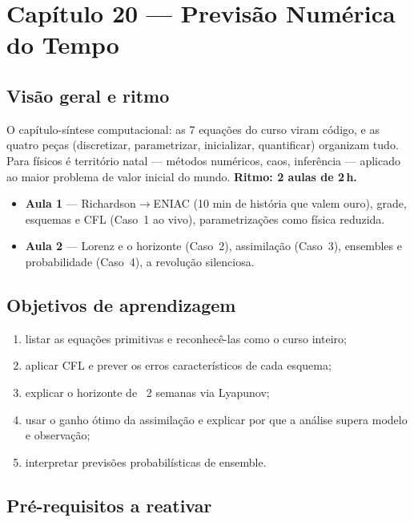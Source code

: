 \section{Capítulo 20 --- Previsão Numérica do Tempo}

\subsection*{Visão geral e ritmo}

O capítulo-síntese computacional: as 7 equações do curso viram
código, e as quatro peças (discretizar, parametrizar, inicializar,
quantificar) organizam tudo. Para físicos é território natal —
métodos numéricos, caos, inferência — aplicado ao maior problema de
valor inicial do mundo. \textbf{Ritmo: 2 aulas de 2\,h.}

\begin{itemize}
  \item \textbf{Aula 1} — Richardson$\to$ENIAC (10 min de história
        que valem ouro), grade, esquemas e CFL (Caso~1 ao vivo),
        parametrizações como física reduzida.
  \item \textbf{Aula 2} — Lorenz e o horizonte (Caso~2), assimilação
        (Caso~3), ensembles e probabilidade (Caso~4), a revolução
        silenciosa.
\end{itemize}

\subsection*{Objetivos de aprendizagem}

\begin{enumerate}
  \item listar as equações primitivas e reconhecê-las como o curso
        inteiro;
  \item aplicar CFL e prever os erros característicos de cada
        esquema;
  \item explicar o horizonte de ~2 semanas via Lyapunov;
  \item usar o ganho ótimo da assimilação e explicar por que a
        análise supera modelo e observação;
  \item interpretar previsões probabilísticas de ensemble.
\end{enumerate}

\subsection*{Pré-requisitos a reativar}

